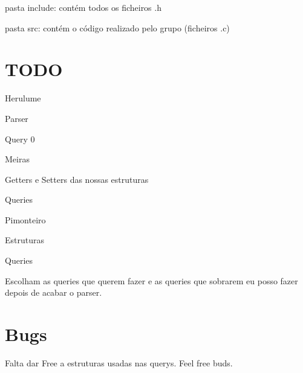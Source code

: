 
\begin{DoxyItemize}
\item pasta {\ttfamily include}\+: contém todos os ficheiros {\ttfamily .h}
\item pasta {\ttfamily src}\+: contém o código realizado pelo grupo (ficheiros {\ttfamily .c})
\end{DoxyItemize}

\section*{T\+O\+DO}


\begin{DoxyItemize}
\item Herulume
\begin{DoxyItemize}
\item Parser
\item Query 0
\end{DoxyItemize}
\item Meiras
\begin{DoxyItemize}
\item Getters e Setters das nossas estruturas
\item Queries
\end{DoxyItemize}
\item Pimonteiro
\begin{DoxyItemize}
\item Estruturas
\item Queries
\end{DoxyItemize}
\end{DoxyItemize}

Escolham as queries que querem fazer e as queries que sobrarem eu posso fazer depois de acabar o parser.

\section*{Bugs}


\begin{DoxyItemize}
\item Falta dar Free a estruturas usadas nas querys. Feel free buds.
\end{DoxyItemize}
